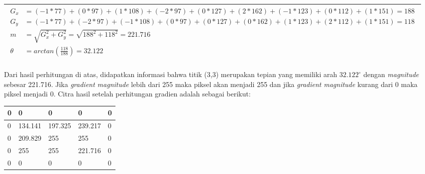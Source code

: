 \begin{table}[H]
	\begin{adjustbox}{width=1\textwidth}
		\begin{tabular}{|p{20cm}|}
			\hline
			\begin{equation}\nonumber
			\begin{aligned}
			G_{x} &= (-1 * 77) + (0 * 97) + (1 * 108) + (-2 * 97) + (0 * 127) + (2 * 162) + (-1 * 123) + (0 * 112) + (1 * 151) = 188 \\
			G_{y} &= (-1 * 77) + (-2 * 97) + (-1 * 108) + (0 * 97) + (0 * 127) + (0 * 162) + (1 * 123) + (2 * 112) + (1 * 151) = 118 \\
			m &= \sqrt{G_{x}^2 + G_{y}^2} = \sqrt{188^2 + 118^2} = 221.716 \\
			\theta &= arctan(\frac{118}{188}) = 32.122 \\
			\end{aligned}
			\end{equation}\\
			\hline
		\end{tabular}
	\end{adjustbox}
	\label{fig:PerhitunganGradiendanArah}
\end{table}

\noindent Dari hasil perhitungan di atas, didapatkan informasi bahwa titik (3,3) merupakan tepian yang memiliki arah $32.122^\circ$ dengan \textit{magnitude} sebesar 221.716. Jika \textit{gradient magnitude} lebih dari 255 maka piksel akan menjadi 255 dan jika \textit{gradient magnitude} kurang dari 0 maka piksel menjadi 0. Citra hasil setelah perhitungan gradien adalah sebagai berikut:

\begin{table}[H]
	\centering
	\begin{small}
		\begin{tabular}{|p{2cm}|p{2cm}|p{2cm}|p{2cm}|p{2cm}|}
			\hline
			0 & 0 & 0 & 0 & 0 \\
			\hline
			0 & 134.141 & 197.325 & 239.217 & 0 \\
			\hline
			0 & 209.829 & 255 & 255 & 0 \\
			\hline
			0 & 255 & 255 & 221.716 & 0 \\
			\hline
			0 & 0 & 0 & 0 & 0 \\
			\hline
		\end{tabular}
	\end{small}
	\label{fig:MatriksCitraHasilPerhitunganGradien}
\end{table}

